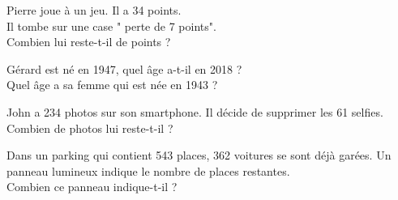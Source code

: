 \documentclass[11pt]{article}
\begin{document}
\begin{multicols}{2}
\begin{exercice}[1]
  Pierre joue à un jeu. Il a 34 points.\\
  Il tombe sur une case " perte de 7 points". \\
  Combien lui reste-t-il de points ?
\end{exercice}
\begin{exercice}[1]
  Gérard est né en 1947, quel âge a-t-il en 2018 ? \\
  Quel âge a sa femme qui est née en 1943 ?
\end{exercice}
\begin{exercice}[1]
  John a 234 photos sur son smartphone. Il décide de supprimer les 61 selfies. \\
  Combien de photos lui reste-t-il ?
\end{exercice}
\begin{exercice}[1]
  Dans un parking qui contient 543 places, 362 voitures se sont déjà garées. Un panneau lumineux indique le nombre de places restantes. \\
  Combien ce panneau indique-t-il ?
\end{exercice}
\end{multicols}

\newpage
\end{document}
